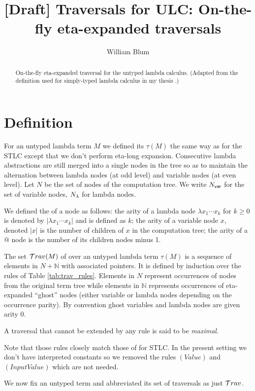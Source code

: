 \documentclass{article}
\author{William Blum}
\title{[Draft] Traversals for ULC: On-the-fly eta-expanded traversals}
\theoremstyle{definition}
\newcommand\Nodes{N}%
\begin{document}
\maketitle
\begin{abstract}
On-the-fly eta-expanded traversal for the untyped lambda calculus.
(Adapted from the definition used for simply-typed lambda calculus in my thesis \cite{BlumPhd}.)
\end{abstract}


\section{Definition}

For an untyped lambda term $M$ we defined its  $\tau(M)$ the same way as for the STLC
except that we don't perform eta-long expansion. Consecutive lambda abstractions are still merged into a single nodes in the tree so as to maintain the alternation between lambda nodes (at odd level) and variable nodes (at even level).
Let $\Nodes$ be the set of nodes of the computation tree. We write $\Nodes_{\sf var}$ for the set of variable nodes, $\Nodes_{\sf \lambda}$ for lambda nodes.

We defined the  of a node as follows: the arity of a lambda node $\lambda x_1 \cdots x_k$ for $k\geq 0$ is denoted by $|\lambda x_1 \cdots x_k|$ and is defined as $k$; the arity of a variable node $x$, denoted $|x|$ is the number of children of $x$ in the computation tree; the arity of a $@$ node is the number of its children nodes minus 1.

The set $\mathcal{T}rav(M)$ of  over an untyped lambda term $\tau(M)$ is a sequence of elements in $N + \mathbb{N}$ with associated pointers. It is defined by induction over the rules of Table \ref{tab:trav_rules}.
Elements in $N$ represent occurrences of nodes from the original term tree while elements in $\mathbb{N}$ represents occurrences of eta-expanded ``ghost'' nodes (either variable or lambda nodes depending on the occurrence parity).
By convention ghost variables and lambda nodes are given arity $0$.

A traversal that cannot be extended by any rule is said to be \emph{maximal}.

Note that those rules closely match those of \cite{BlumPhd} for STLC. In the present setting we don't have interpreted constants so we removed the rules $(Value)$ and $(InputValue)$ which are not needed.

We now fix an untyped term and abbreviated its set of traversals as just $\mathcal{T}rav$.
\end{document}
